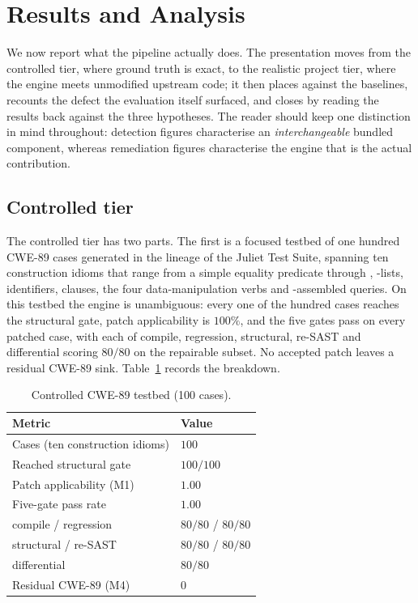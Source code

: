 \section{Results and Analysis}
\label{rem:results}

We now report what the pipeline actually does. The presentation moves from
the controlled tier, where ground truth is exact, to the realistic project
tier, where the engine meets unmodified upstream code; it then places
\irsam{} against the baselines, recounts the defect the evaluation itself
surfaced, and closes by reading the results back against the three
hypotheses. The reader should keep one distinction in mind throughout:
detection figures characterise an \emph{interchangeable} bundled component,
whereas remediation figures characterise the engine that is the actual
contribution.

\subsection{Controlled tier}
\label{sec:res-snippet}

The controlled tier has two parts. The first is a focused
 testbed of one hundred CWE-89 cases generated in
the lineage of the Juliet Test Suite, spanning ten construction idioms that
range from a simple equality predicate through , -lists,
 identifiers,  clauses, the four data-manipulation
verbs and -assembled queries. On this testbed the engine
is unambiguous: every one of the hundred cases reaches the structural gate,
patch applicability is $100\%$, and the five gates pass on every patched
case, with each of compile, regression, structural, re-SAST and differential
scoring $80/80$ on the repairable subset. No accepted patch leaves a residual
CWE-89 sink. Table~\ref{tab:juliet} records the breakdown.

\begin{table}[ht]
\centering
\caption{Controlled CWE-89 testbed (100 cases).}
\label{tab:juliet}
\begin{tabular}{p{7.6cm}p{4.4cm}}
\hline
\textbf{Metric} & \textbf{Value} \\
\hline
Cases (ten construction idioms)   & $100$ \\
Reached structural gate           & $100/100$ \\
Patch applicability (M1)          & $1.00$ \\
Five-gate pass rate               & $1.00$ \\
\quad compile / regression        & $80/80$ \;/\; $80/80$ \\
\quad structural / re-SAST        & $80/80$ \;/\; $80/80$ \\
\quad differential                & $80/80$ \\
Residual CWE-89 (M4)              & $0$ \\
\hline
\end{tabular}
\end{table}

